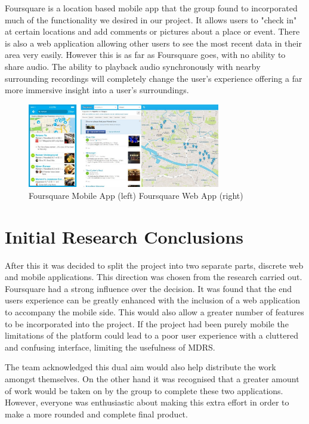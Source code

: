 \documentclass{l3proj}
\begin{document}
Foursquare\cite{foursquare} is a location based mobile app that the group found to incorporated much of the functionality we desired in our project. It allows users to "check in" at certain locations and add comments or pictures about a place or event. There is also a web application allowing other users to see the most recent data in their area very easily. However this is as far as Foursquare goes, with no ability to share audio. The ability to playback audio synchronously with nearby surrounding recordings will completely change the user's experience offering a far more immersive insight into a user's surroundings.

\begin{figure}[ht!]
  \centering
\includegraphics[width=0.75\textwidth]{images/foursquare.jpg}
\caption{Foursquare Mobile App (left) Foursquare Web App (right)}
\end{figure}

\section{Initial Research Conclusions}

After this it was decided to split the project into two separate parts, discrete web and mobile applications. This direction was chosen from the research carried out. Foursquare had a strong influence over the decision. It was found that the end users experience can be greatly enhanced with the inclusion of a web application to accompany the mobile side. This would also allow a greater number of features to be incorporated into the project. If the project had been purely mobile the limitations of the platform could lead to a poor user experience with a cluttered and confusing interface, limiting the usefulness of MDRS.

The team acknowledged this dual aim would also help distribute the work amongst themselves. On the other hand it was recognised that a greater amount of work would be taken on by the group to complete these two applications. However, everyone was enthusiastic about making this extra effort in order to make a more rounded and complete final product.
\end{document}
